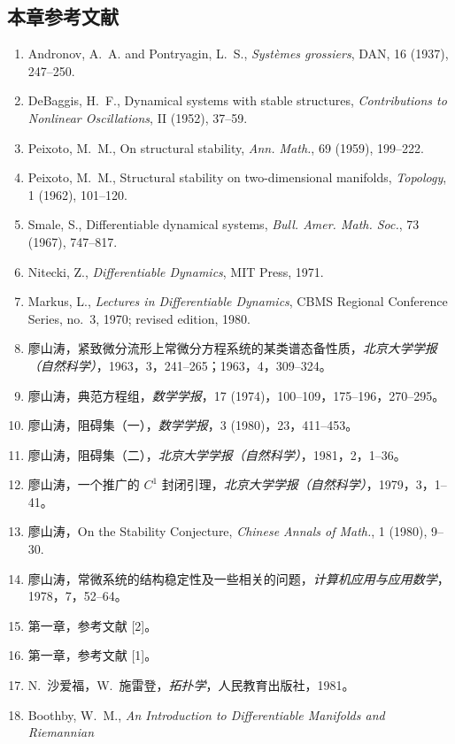 \subsection*{本章参考文献}
\begin{enumerate}
  \item Andronov, A.~A. and Pontryagin, L.~S., \textit{Syst\`emes grossiers}, DAN, 16 (1937),
  247--250.
  \item DeBaggis, H.~F., Dynamical systems with stable structures, \textit{Contributions to
  Nonlinear Oscillations}, II (1952), 37--59.
  \item Peixoto, M.~M., On structural stability, \textit{Ann. Math.}, 69 (1959), 199--222.
  \item Peixoto, M.~M., Structural stability on two-dimensional manifolds, \textit{Topology},
  1 (1962), 101--120.
  \item Smale, S., Differentiable dynamical systems, \textit{Bull. Amer. Math. Soc.}, 73
  (1967), 747--817.
  \item Nitecki, Z., \textit{Differentiable Dynamics}, MIT Press, 1971.
  \item Markus, L., \textit{Lectures in Differentiable Dynamics}, CBMS Regional Conference
  Series, no.~3, 1970; revised edition, 1980.
  \item 廖山涛，紧致微分流形上常微分方程系统的某类谱态备性质，\textit{北京大学学报
  （自然科学）}，1963，3，241--265；1963，4，309--324。
  \item 廖山涛，典范方程组，\textit{数学学报}，17 (1974)，100--109，175--196，270--295。
  \item 廖山涛，阻碍集（一），\textit{数学学报}，3 (1980)，23，411--453。
  \item 廖山涛，阻碍集（二），\textit{北京大学学报（自然科学）}，1981，2，1--36。
  \item 廖山涛，一个推广的 $C^1$ 封闭引理，\textit{北京大学学报（自然科学）}，1979，3，1--41。
  \item 廖山涛，On the Stability Conjecture, \textit{Chinese Annals of Math.}, 1 (1980),
  9--30.
  \item 廖山涛，常微系统的结构稳定性及一些相关的问题，\textit{计算机应用与应用数学}，
  1978，7，52--64。
  \item 第一章，参考文献 [2]。
  \item 第一章，参考文献 [1]。
  \item N.~沙爱福，W.~施雷登，\textit{拓扑学}，人民教育出版社，1981。
  \item Boothby, W.~M., \textit{An Introduction to Differentiable Manifolds and Riemannian
}
\end{enumerate}
